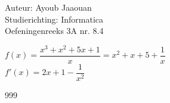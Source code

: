 \documentclass[a4paper]{article}
\begin{document}
\noindent \large Auteur: Ayoub Jaaouan \\
\noindent \large Studierichting: Informatica\\
\noindent \large Oefeningenreeks 3A nr. 8.4\\

\medskip

\normalsize

$f(x) = \dfrac{x^3+x^2+5x+1}{x} = x^2+x+5 + \dfrac{1}{x} $  \\

$f'(x) = 2x+1 - \dfrac{1}{x^2}$  \\



\begin{thebibliography}{999}
\end{thebibliography}
\end{document}
